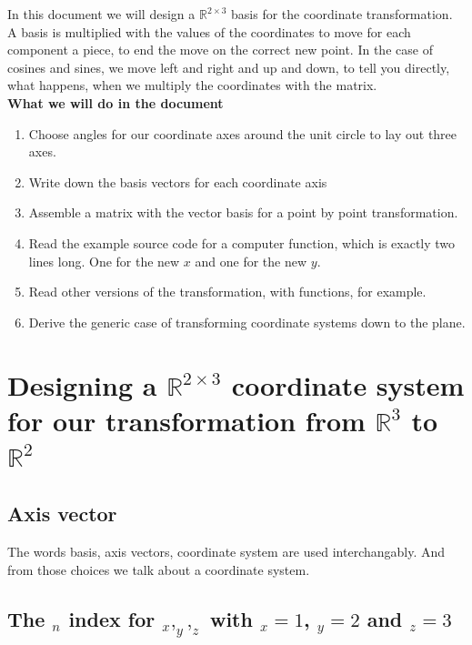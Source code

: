 \documentclass[a4paper]{article}
\begin{document}
In this document we will design a $\mathbb{R}^{2\times{3}}$ basis for the coordinate transformation. 
A basis is multiplied with the values of the coordinates to move for each component 
a piece, to end the move on the correct new point.
In the case of cosines and sines, we move left and right and up and down, to 
tell you directly, what happens, when we multiply the coordinates with the matrix.\\

\textbf{What we will do in the document}

\begin{enumerate}
\item Choose angles for our coordinate axes around the unit circle to lay out three axes.
\item Write down the basis vectors for each coordinate axis
\item Assemble a matrix with the vector basis for a point by point transformation.
\item Read the example source code for a computer function, which is exactly two lines long. One for the new $x$ and one for the new $y$.
\item Read other versions of the transformation, with functions, for example.
\item Derive the generic case of transforming coordinate systems down to the plane.

\end{enumerate}


\section{Designing a $\mathbb{R}^{2\times{3}}$ coordinate system for our transformation from $\mathbb{R}^{3}$ to $\mathbb{R}^{2}$}

\subsection{Axis vector}

The words basis, axis vectors, coordinate system are used interchangably. And from those choices we talk about a coordinate system.

\subsection{The $_{n}$ index for $_x,_y,_z$ with $_x=1$, $_y=2$ and $_z=3$}
\end{document}
